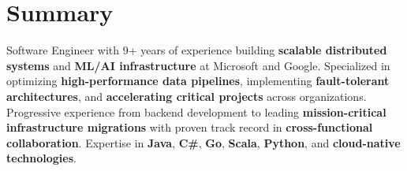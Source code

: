 \section{Summary}
\footnotesize{Software Engineer with 9+ years of experience building \textbf{scalable distributed systems} and \textbf{ML/AI infrastructure} at Microsoft and Google. Specialized in optimizing \textbf{high-performance data pipelines}, implementing \textbf{fault-tolerant architectures}, and \textbf{accelerating critical projects} across organizations. Progressive experience from backend development to leading \textbf{mission-critical infrastructure migrations} with proven track record in \textbf{cross-functional collaboration}. Expertise in \textbf{Java}, \textbf{C\#}, \textbf{Go}, \textbf{Scala}, \textbf{Python}, and \textbf{cloud-native technologies}.}